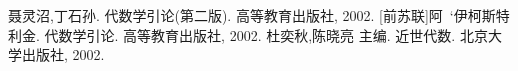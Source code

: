 
\begin{thebibliography}{99}
    聂灵沼,丁石孙. 代数学引论(第二版). 高等教育出版社, 2002.
    [前苏联]阿~`伊柯斯特利金. 代数学引论. 高等教育出版社, 2002.
    杜奕秋,陈晓亮 主编. 近世代数. 北京大学出版社, 2002.
\end{thebibliography}



